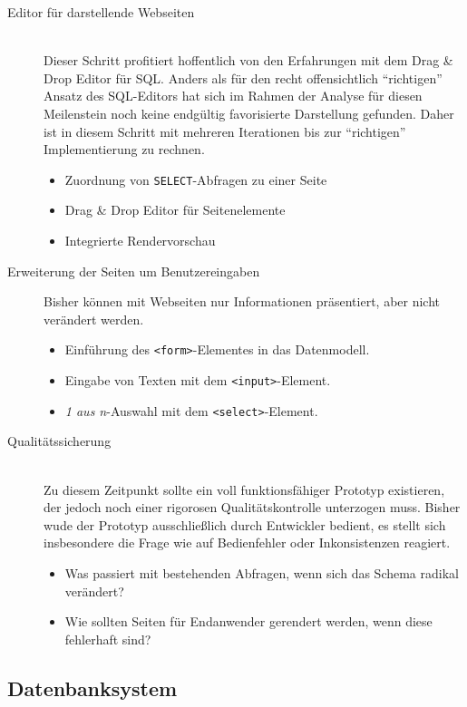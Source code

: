 \begin{description}
\item [Editor für darstellende Webseiten] \hfill \\
  Dieser Schritt profitiert hoffentlich von den Erfahrungen mit dem Drag \& Drop Editor für SQL. Anders als für den recht offensichtlich "`richtigen"' Ansatz des SQL-Editors hat sich im Rahmen der Analyse für diesen Meilenstein noch keine endgültig favorisierte Darstellung gefunden. Daher ist in diesem Schritt mit mehreren Iterationen bis zur "`richtigen"' Implementierung zu rechnen.
  \begin{itemize}[noitemsep]
  \item Zuordnung von \texttt{SELECT}-Abfragen zu einer Seite
  \item Drag \& Drop Editor für Seitenelemente
  \item Integrierte Rendervorschau
  \end{itemize}
  
\item[Erweiterung der Seiten um Benutzereingaben]
  Bisher können mit Webseiten nur Informationen präsentiert, aber nicht verändert werden.
  \begin{itemize}[noitemsep]
  \item Einführung des \texttt{<form>}-Elementes in das Datenmodell.
  \item Eingabe von Texten mit dem \texttt{<input>}-Element.
  \item \textit{1 aus n}-Auswahl mit dem \texttt{<select>}-Element.
  \end{itemize}
  
\item [Qualitätssicherung] \hfill \\
  Zu diesem Zeitpunkt sollte ein voll funktionsfähiger Prototyp existieren, der jedoch noch einer rigorosen Qualitätskontrolle unterzogen muss. Bisher wude der Prototyp ausschließlich durch Entwickler bedient, es stellt sich insbesondere die Frage wie \idename{} auf Bedienfehler oder Inkonsistenzen reagiert.
  \begin{itemize}[noitemsep]
  \item Was passiert mit bestehenden Abfragen, wenn sich das Schema radikal verändert?
  \item Wie sollten Seiten für Endanwender gerendert werden, wenn diese fehlerhaft sind?
  \end{itemize}
\end{description}

\subsection{Datenbanksystem}
\label{sec:implementation-database-system}

